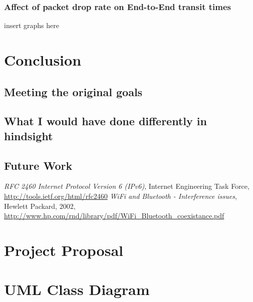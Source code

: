 \subsection{Affect of packet drop rate on End-to-End transit times}

insert graphs here



\cleardoublepage
\chapter{Conclusion}
\section{Meeting the original goals}
\section{What I would have done differently in hindsight}
\section{Future Work}

\cleardoublepage



\begin{thebibliography}{9}
 \emph{RFC 2460 Internet Protocol Version 6 (IPv6)},
 Internet Engineering Task Force,
 \url{http://tools.ietf.org/html/rfc2460}
 \emph{WiFi and Bluetooth - Interference issues},
 Hewlett Packard, 2002,
 \url{http://www.hp.com/rnd/library/pdf/WiFi_Bluetooth_coexistance.pdf}
\end{thebibliography}


%
\cleardoublepage

\appendix

\chapter{Project Proposal}

%

\chapter{UML Class Diagram}

